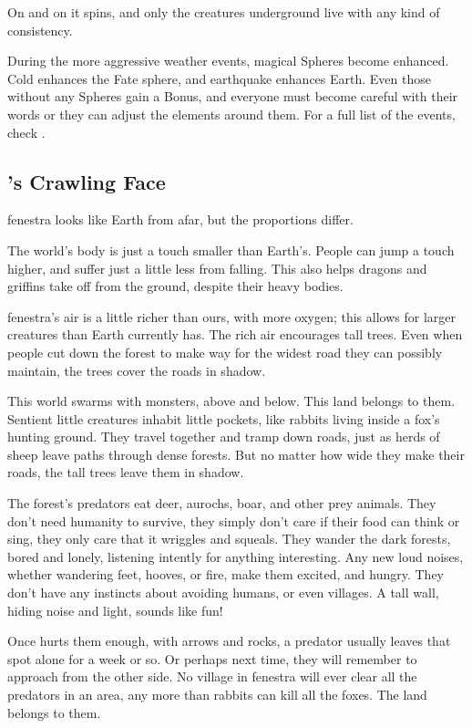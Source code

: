 \begin{multicols}{2}
On and on it spins, and only the creatures underground live with any kind of consistency.

During the more aggressive weather events, magical Spheres become enhanced.
Cold enhances the Fate sphere, and earthquake enhances Earth.
Even those without any Spheres gain a Bonus, and everyone must become careful with their words or they can adjust the elements around them.
For a full list of the events, check .

\subsection{'s Crawling Face}

\Gls{fenestra} looks like Earth from afar, but the proportions differ.

The world's body is just a touch smaller than Earth's.
People can jump a touch higher, and suffer just a little less from falling.
This also helps dragons and griffins take off from the ground, despite their heavy bodies.

\Gls{fenestra}'s air is a little richer than ours, with more oxygen; this allows for larger creatures than Earth currently has.
The rich air encourages tall trees.
Even when people cut down the forest to make way for the widest road they can possibly maintain, the trees cover the roads in shadow.

This world swarms with monsters, above and below.
This land belongs to them.
Sentient little creatures inhabit little pockets, like rabbits living inside a fox's hunting ground.
They travel together and tramp down roads, just as herds of sheep leave paths through dense forests.
But no matter how wide they make their roads, the tall trees leave them in shadow.

The forest's predators eat deer, aurochs, boar, and other prey animals.
They don't need humanity to survive, they simply don't care if their food can think or sing, they only care that it wriggles and squeals.
They wander the dark forests, bored and lonely, listening intently for anything interesting.
Any new loud noises, whether wandering feet, hooves, or fire, make them excited, and hungry.
They don't have any instincts about avoiding humans, or even \glspl{village}.
A tall wall, hiding noise and light, sounds like fun!

Once  hurts them enough, with arrows and rocks, a predator usually leaves that spot alone for a week or so.
Or perhaps next time, they will remember to approach from the other side.
No \gls{village} in \gls{fenestra} will ever clear all the predators in an area, any more than rabbits can kill all the foxes.
The land belongs to them.


\end{multicols}
